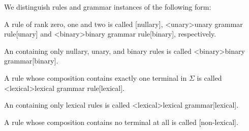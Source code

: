 \documentclass[../../document.tex]{subfiles}
\begin{document}
    \begin{definition}
        We distinguish rules and grammar instances of the following form:
        \begin{compactitem}
            \item A rule of rank zero, one and two is called [nullary], <unary>{unary grammar rule}[unary] and <binary>{binary grammar rule}[binary], respectively.
            \item An  containing only nullary, unary, and binary rules is called <binary>{binary grammar}[binary].
            \item A rule whose composition contains exactly one terminal in \(\varSigma\) is called <lexical>{lexical grammar rule}[lexical].
            \item An  containing only lexical rules is called <lexical>{lexical grammar}[lexical].
            \item A rule whose composition contains no terminal at all is called [non-lexical].
        \end{compactitem}
    \end{definition}
\end{document}

